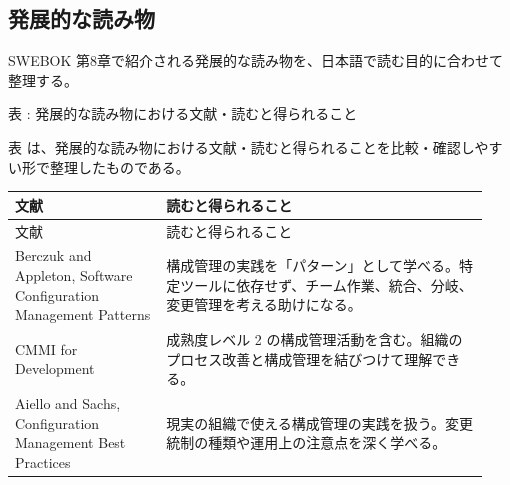 \subsection*{発展的な読み物}
SWEBOK 第8章で紹介される発展的な読み物を、日本語で読む目的に合わせて整理する。

\par\smallskip\noindent{}\label{tab:ch08-09}表 \thetable: 発展的な読み物における文献・読むと得られること\par\smallskip
表 \thetable は、発展的な読み物における文献・読むと得られることを比較・確認しやすい形で整理したものである。\par\smallskip
\begin{longtable}{p{0.30\linewidth}p{0.64\linewidth}}\toprule
文献 & 読むと得られること \\ \midrule
\endfirsthead\toprule
文献 & 読むと得られること \\ \midrule
\endhead
Berczuk and Appleton, Software Configuration Management Patterns & 構成管理の実践を「パターン」として学べる。特定ツールに依存せず、チーム作業、統合、分岐、変更管理を考える助けになる。 \\
CMMI for Development & 成熟度レベル 2 の構成管理活動を含む。組織のプロセス改善と構成管理を結びつけて理解できる。 \\
Aiello and Sachs, Configuration Management Best Practices & 現実の組織で使える構成管理の実践を扱う。変更統制の種類や運用上の注意点を深く学べる。 \\
\bottomrule\end{longtable}
